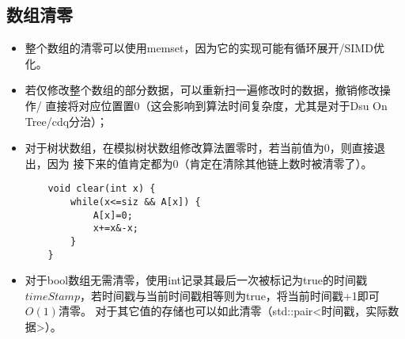 \subsection{数组清零}
\begin{itemize}
    \item 整个数组的清零可以使用memset，因为它的实现可能有循环展开/SIMD优化。
    \item 若仅修改整个数组的部分数据，可以重新扫一遍修改时的数据，撤销修改操作/
    直接将对应位置置0（这会影响到算法时间复杂度，尤其是对于Dsu On Tree/cdq分治）；
    \item 对于树状数组，在模拟树状数组修改算法置零时，若当前值为0，则直接退出，因为
    接下来的值肯定都为0（肯定在清除其他链上数时被清零了）。
    \begin{lstlisting}
    void clear(int x) {
        while(x<=siz && A[x]) {
            A[x]=0;
            x+=x&-x;
        }
    }
    \end{lstlisting}
    \item 对于bool数组无需清零，使用int记录其最后一次被标记为true的时间戳
    $timeStamp$，若时间戳与当前时间戳相等则为true，将当前时间戳+1即可$O(1)$清零。
    对于其它值的存储也可以如此清零（std::pair<时间戳，实际数据>）。
\end{itemize}

